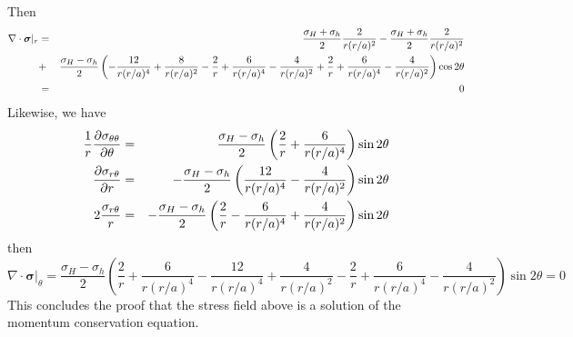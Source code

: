 Then 
\begin{eqnarray}
\nabla \cdot {\bm \sigma} |_r
&=& \frac{\sigma_H+\sigma_h}{2} \frac{2}{r (r/a)^2} 
- \frac{\sigma_H+\sigma_h}{2}\frac{2}{r(r/a)^2} \nonumber \\
&+& \frac{\sigma_H-\sigma_h}{2}
\left( 
- \frac{12}{r(r/a)^4} + \frac{8}{r(r/a)^2}   
-\frac2r +  \frac{6}{r(r/a)^4} - \frac{4}{r(r/a)^2}
+\frac2r+  \frac{6}{r(r/a)^4} -\frac{4}{r(r/a)^2}
\right) \cos 2\theta \nonumber\\
&=&0 \nonumber
\end{eqnarray}
Likewise, we have
\begin{eqnarray}
\frac{1}{r} \frac{\partial \sigma_{\theta \theta}}{\partial \theta} 
&=&\frac{\sigma_H-\sigma_h}{2} 
\left( \frac2r + \frac{6}{r(r/a)^4}   \right) \sin 2\theta   
\nonumber\\
\frac{\partial \sigma_{r \theta}}{\partial r} 
&=& -\frac{\sigma_H-\sigma_h}{2}  \left(   \frac{12}{r(r/a)^4} - \frac{4}{r(r/a)^2} \right) \sin 2\theta
\nonumber\\
2\frac{\sigma_{r \theta}}{r}  
&=& - \frac{\sigma_H-\sigma_h}{2} 
 \left( \frac2r -  \frac{6}{r(r/a)^4} + \frac{4}{r(r/a)^2} \right) \sin 2\theta
\nonumber
\end{eqnarray}
then
\[
\nabla \cdot {\bm \sigma} |_\theta
=\frac{\sigma_H-\sigma_h}{2} 
\left(
\frac2r + \frac{6}{r(r/a)^4}  
-  \frac{12}{r(r/a)^4} + \frac{4}{r(r/a)^2}
-\frac2r +  \frac{6}{r(r/a)^4} - \frac{4}{r(r/a)^2}
\right) \sin 2\theta =0
\]
This concludes the proof that the stress field above is a solution 
of the momentum conservation equation.









